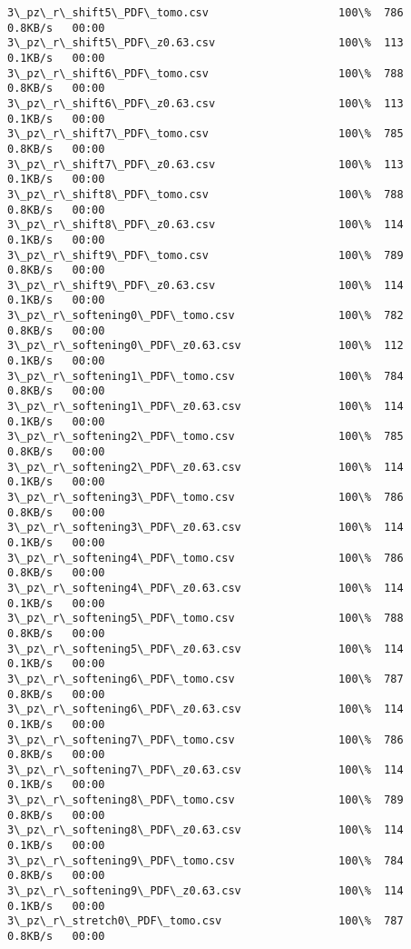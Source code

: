 \documentclass[11pt]{article}
\begin{document}
\begin{Verbatim}[commandchars=\\\{\}]
3\_pz\_r\_shift5\_PDF\_tomo.csv                    100\%  786     0.8KB/s   00:00    
3\_pz\_r\_shift5\_PDF\_z0.63.csv                   100\%  113     0.1KB/s   00:00    
3\_pz\_r\_shift6\_PDF\_tomo.csv                    100\%  788     0.8KB/s   00:00    
3\_pz\_r\_shift6\_PDF\_z0.63.csv                   100\%  113     0.1KB/s   00:00    
3\_pz\_r\_shift7\_PDF\_tomo.csv                    100\%  785     0.8KB/s   00:00    
3\_pz\_r\_shift7\_PDF\_z0.63.csv                   100\%  113     0.1KB/s   00:00    
3\_pz\_r\_shift8\_PDF\_tomo.csv                    100\%  788     0.8KB/s   00:00    
3\_pz\_r\_shift8\_PDF\_z0.63.csv                   100\%  114     0.1KB/s   00:00    
3\_pz\_r\_shift9\_PDF\_tomo.csv                    100\%  789     0.8KB/s   00:00    
3\_pz\_r\_shift9\_PDF\_z0.63.csv                   100\%  114     0.1KB/s   00:00    
3\_pz\_r\_softening0\_PDF\_tomo.csv                100\%  782     0.8KB/s   00:00    
3\_pz\_r\_softening0\_PDF\_z0.63.csv               100\%  112     0.1KB/s   00:00    
3\_pz\_r\_softening1\_PDF\_tomo.csv                100\%  784     0.8KB/s   00:00    
3\_pz\_r\_softening1\_PDF\_z0.63.csv               100\%  114     0.1KB/s   00:00    
3\_pz\_r\_softening2\_PDF\_tomo.csv                100\%  785     0.8KB/s   00:00    
3\_pz\_r\_softening2\_PDF\_z0.63.csv               100\%  114     0.1KB/s   00:00    
3\_pz\_r\_softening3\_PDF\_tomo.csv                100\%  786     0.8KB/s   00:00    
3\_pz\_r\_softening3\_PDF\_z0.63.csv               100\%  114     0.1KB/s   00:00    
3\_pz\_r\_softening4\_PDF\_tomo.csv                100\%  786     0.8KB/s   00:00    
3\_pz\_r\_softening4\_PDF\_z0.63.csv               100\%  114     0.1KB/s   00:00    
3\_pz\_r\_softening5\_PDF\_tomo.csv                100\%  788     0.8KB/s   00:00    
3\_pz\_r\_softening5\_PDF\_z0.63.csv               100\%  114     0.1KB/s   00:00    
3\_pz\_r\_softening6\_PDF\_tomo.csv                100\%  787     0.8KB/s   00:00    
3\_pz\_r\_softening6\_PDF\_z0.63.csv               100\%  114     0.1KB/s   00:00    
3\_pz\_r\_softening7\_PDF\_tomo.csv                100\%  786     0.8KB/s   00:00    
3\_pz\_r\_softening7\_PDF\_z0.63.csv               100\%  114     0.1KB/s   00:00    
3\_pz\_r\_softening8\_PDF\_tomo.csv                100\%  789     0.8KB/s   00:00    
3\_pz\_r\_softening8\_PDF\_z0.63.csv               100\%  114     0.1KB/s   00:00    
3\_pz\_r\_softening9\_PDF\_tomo.csv                100\%  784     0.8KB/s   00:00    
3\_pz\_r\_softening9\_PDF\_z0.63.csv               100\%  114     0.1KB/s   00:00    
3\_pz\_r\_stretch0\_PDF\_tomo.csv                  100\%  787     0.8KB/s   00:00    

\end{Verbatim}
\end{document}
